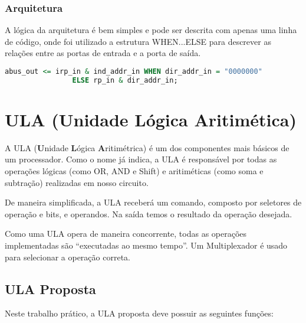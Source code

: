 \documentclass{article}
\begin{document}
\subsubsection{Arquitetura}

A lógica da arquitetura é bem simples e pode ser descrita com apenas uma linha de código, onde foi utilizado a estrutura WHEN...ELSE para descrever as relações entre as portas de entrada e a porta de saída.

\begin{lstlisting}[language=VHDL]
    abus_out <= irp_in & ind_addr_in WHEN dir_addr_in = "0000000"
                ELSE rp_in & dir_addr_in;
\end{lstlisting}

\section{ULA (Unidade Lógica Aritimética)}

A ULA (\textbf{U}nidade \textbf{L}ógica \textbf{A}ritimétrica) é um dos componentes mais básicos de um processador. Como o nome já indica, a ULA é responsável por todas as operações lógicas (como OR, AND e Shift) e aritiméticas (como soma e subtração) realizadas em nosso circuito.

De maneira simplificada, a ULA receberá um comando, composto por seletores de operação e bits, e operandos. Na saída temos o resultado da operação desejada.

Como uma ULA opera de maneira concorrente, todas as operações implementadas são ``executadas ao mesmo tempo''. Um Multiplexador é usado para selecionar a operação correta.

\subsection{ULA Proposta}

Neste trabalho prático, a ULA proposta deve possuir as seguintes funções:
\end{document}
